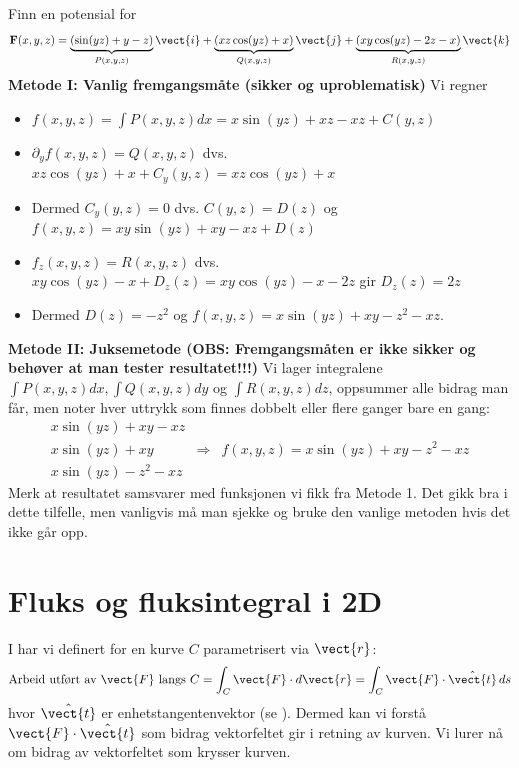 
\begin{eks}{}
Finn en potensial for 
\[\mathbf{F}(x,y,z)=\underbrace{(\sin(yz)+y-z)}_{P(x,y,z)}\vect{i}+\underbrace{(xz\cos(yz)+x)}_{Q(x,y,z)}\vect{j}+\underbrace{(xy\cos(yz)-2z-x)}_{R(x,y,z)}\vect{k}\]
\textbf{Metode I: Vanlig fremgangsmåte (sikker og uproblematisk)} Vi regner
\begin{itemize}
\item $f(x,y,z)=\int P(x,y,z)dx = x\sin(yz)+xz-xz+C(y,z)$
\item $\partial_y f(x,y,z) = Q(x,y,z)$ dvs. $xz\cos (yz)+x+C_y(y,z)=xz\cos(yz)+x$
\item Dermed $C_y(y,z)=0$ dvs. $C(y,z)=D(z)$ og $f(x,y,z)=xy\sin (yz)+xy-xz+D(z)$
\item $f_z(x,y,z)=R(x,y,z)$ dvs. $xy\cos(yz)-x+D_z(z)=xy\cos(yz)-x-2z$ gir $D_z(z)=2z$
\item Dermed $D(z)=-z^2$ og $f(x,y,z)=x\sin(yz)+xy-z^2-xz$.
\end{itemize}
\textbf{Metode II: Juksemetode (OBS: Fremgangsmåten er ikke sikker og behøver at man tester resultatet!!!)}
Vi lager integralene $\int P(x,y,z)dx, \int Q(x,y,z)dy$ og $\int R(x,y,z)dz$, oppsummer alle bidrag man får, men noter hver uttrykk som finnes dobbelt eller flere ganger bare en gang:
\begin{align*}
x\sin(yz)+xy-xz &&\\
x \sin (yz)+xy  & \Rightarrow& f(x,y,z)=x\sin (yz)+xy-z^2-xz\\
x\sin (yz)-z^2-xz &&
\end{align*}
Merk at resultatet samsvarer med funksjonen vi fikk fra Metode 1. Det gikk bra i dette tilfelle, men vanligvis må man sjekke og bruke den vanlige metoden hvis det ikke går opp.
\end{eks}

%
%
%
\section{Fluks og fluksintegral i 2D}\label{sect:fluks2d}

I  har vi definert for en kurve $C$ parametrisert via $\vect{r}$:
\[
\text{Arbeid utført av } \vect{F} \text{ langs } C = \int_C \vect{F} \cdot d\vect{r} = \int_C \vect{F} \cdot \hat{\vect{t}} \, ds
\]
hvor $\hat{\vect{t}}$ er enhetstangentenvektor (se ). Dermed kan vi forstå $\vect{F} \cdot \hat{\vect{t}}$ som bidrag vektorfeltet gir i retning av kurven. Vi lurer nå om bidrag av vektorfeltet som krysser kurven.

